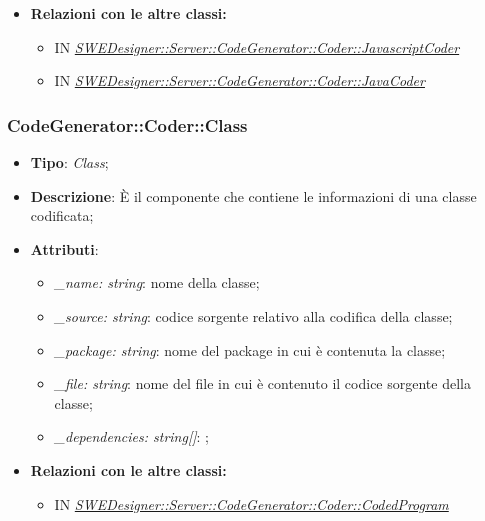 \documentclass[../DefinizioneDiProdotto.tex]{subfiles}
\begin{document}
\begin{itemize}
				\item \textbf{Relazioni con le altre classi:}
				\begin{itemize}
					\item IN \hyperlink{SWEDesigner::Server::CodeGenerator::Coder::JavascriptCoder}{\emph{SWEDesigner::Server::CodeGenerator::Coder::JavascriptCoder}}
					\item IN \hyperlink{SWEDesigner::Server::CodeGenerator::Coder::JavaCoder}{\emph{SWEDesigner::Server::CodeGenerator::Coder::JavaCoder}}
				\end{itemize}	
			\end{itemize}
			
			\subsubsection{CodeGenerator::Coder::Class}
			\hypertarget{SWEDesigner::Server::CodeGenerator::Coder::Class}{}
			\begin{itemize}
				\item \textbf{Tipo}: \emph{Class};
				\item \textbf{Descrizione}: È il componente che contiene le informazioni di una classe codificata; \\
				\item \textbf{Attributi}:
				\begin{itemize}
					\item \emph{\_name: string}: nome della classe;
					\item \emph{\_source: string}: codice sorgente relativo alla codifica della classe;
					\item \emph{\_package: string}: nome del package in cui è contenuta la classe;
					\item \emph{\_file: string}: nome del file in cui è contenuto il codice sorgente della classe;
					\item \emph{\_dependencies: string[]}: ;
				\end{itemize}
				\item \textbf{Relazioni con le altre classi:}
				\begin{itemize}
					\item IN \hyperlink{SWEDesigner::Server::CodeGenerator::Coder::JavascriptCoder}{\emph{SWEDesigner::Server::CodeGenerator::Coder::CodedProgram}}
				\end{itemize}	
			\end{itemize}
			
\end{document}

